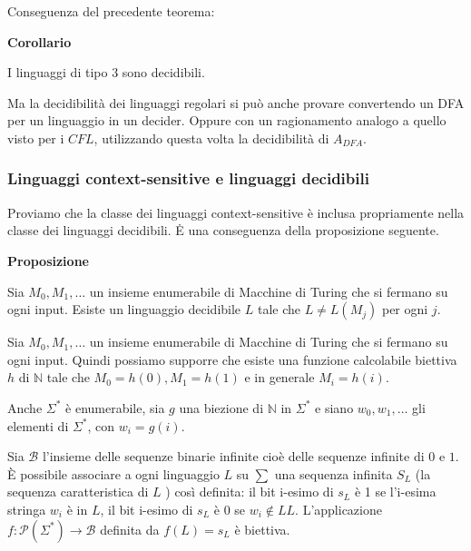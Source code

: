 \vspace{5mm}

Conseguenza del precedente teorema:

\vspace{5mm}

\textbf{Corollario}

I linguaggi di tipo 3 sono decidibili.

\vspace{5mm}


Ma la decidibilità dei linguaggi regolari si può anche provare convertendo un DFA per un linguaggio in un decider. Oppure con un ragionamento analogo a quello visto per i $C F L$, utilizzando questa volta la decidibilità di $A_{D F A}$.

\subsubsection{Linguaggi context-sensitive e linguaggi decidibili}

Proviamo che la classe dei linguaggi context-sensitive è inclusa propriamente nella classe dei linguaggi decidibili. Ė una conseguenza della proposizione seguente.

\vspace{5mm}

\textbf{Proposizione}

Sia $M_{0}, M_{1}, \ldots$ un insieme enumerabile di Macchine di Turing che si fermano su ogni input. Esiste un linguaggio decidibile $L$ tale che $L \neq L\left(M_{j}\right)$ per ogni $j$.

\vspace{5mm}

Sia $M_{0}, M_{1}, \ldots$ un insieme enumerabile di Macchine di Turing che si fermano su ogni input. Quindi possiamo supporre che esiste una funzione calcolabile biettiva $h$ di $\mathbb{N}$ tale che $M_{0}=h(0), M_{1}=h(1)$ e in generale $M_{i}=h(i)$.

Anche $\Sigma^{*}$ è enumerabile, sia $g$ una biezione di $\mathbb{N}$ in $\Sigma^{*}$ e siano $w_{0}, w_{1}, \ldots$ gli elementi di $\Sigma^{*}$, con $w_{i}=g(i)$.

\vspace{5mm}

Sia $\mathcal{B}$ l'insieme delle sequenze binarie infinite cioè delle sequenze infinite di 0 e $1 .$
È possibile associare a ogni linguaggio $L$ su $\sum$ una sequenza infinita $S_{L}$ (la sequenza caratteristica di $L$ ) così definita:
il bit i-esimo di $s_{L}$ è 1 se   l'i-esima stringa $w_{i}$ è in $L$, il bit i-esimo di $s_{L}$ è 0 se $w_{i} \notin L L$.
L'applicazione $f: \mathcal{P}\left(\Sigma^{*}\right) \rightarrow \mathcal{B}$ definita da $f(L)=s_{L}$ è biettiva.

